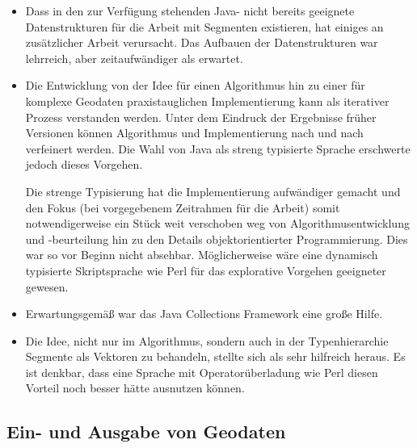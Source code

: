 \documentclass[../main/thesis.tex]{subfiles}
\begin{document}
\begin{itemize}

\item
Dass in den zur Verfügung stehenden Java- nicht bereits geeignete Datenstrukturen für die Arbeit mit Segmenten existieren, hat einiges an zusätzlicher Arbeit verursacht.
Das Aufbauen der Datenstrukturen war lehrreich, aber zeitaufwändiger als erwartet.

\item
Die Entwicklung von der Idee für einen Algorithmus hin zu einer für komplexe Geodaten praxistauglichen Implementierung kann als iterativer Prozess verstanden werden.
Unter dem Eindruck der Ergebnisse früher Versionen können Algorithmus und Implementierung nach und nach verfeinert werden.
Die Wahl von Java als streng typisierte Sprache erschwerte jedoch dieses Vorgehen.

Die strenge Typisierung hat die Implementierung aufwändiger gemacht und den Fokus (bei vorgegebenem Zeitrahmen für die Arbeit) somit notwendigerweise ein Stück weit verschoben weg von Algorithmusentwicklung und -beurteilung hin zu den Details objektorientierter Programmierung.
Dies war so vor Beginn nicht absehbar.
Möglicherweise wäre eine dynamisch typisierte Skriptsprache wie Perl für das explorative Vorgehen geeigneter gewesen.

\item
Erwartungsgemäß war das Java Collections Framework eine große Hilfe.

\item
Die Idee, nicht nur im Algorithmus, sondern auch in der Typenhierarchie Segmente als Vektoren zu behandeln, stellte sich als sehr hilfreich heraus.
Es ist denkbar, dass eine Sprache mit Operatorüberladung wie Perl diesen Vorteil noch besser hätte ausnutzen können.

\end{itemize}



\subsection{Ein- und Ausgabe von Geodaten}
\end{document}
